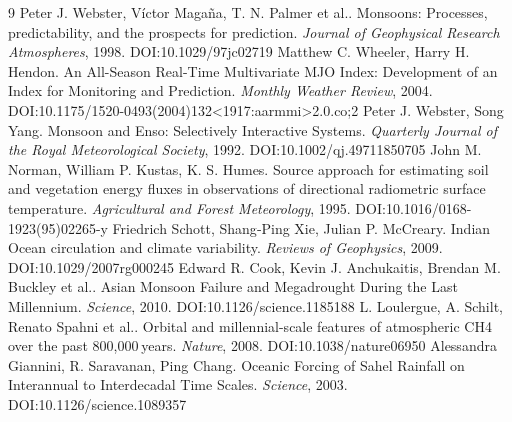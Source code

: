 \documentclass[11pt]{article}
\begin{document}
\begin{thebibliography}{9}
 Peter J. Webster, Víctor Magaña, T. N. Palmer et al.. Monsoons: Processes, predictability, and the prospects for prediction. \emph{Journal of Geophysical Research Atmospheres}, 1998. DOI:10.1029/97jc02719
 Matthew C. Wheeler, Harry H. Hendon. An All-Season Real-Time Multivariate MJO Index: Development of an Index for Monitoring and Prediction. \emph{Monthly Weather Review}, 2004. DOI:10.1175/1520-0493(2004)132<1917:aarmmi>2.0.co;2
 Peter J. Webster, Song Yang. Monsoon and Enso: Selectively Interactive Systems. \emph{Quarterly Journal of the Royal Meteorological Society}, 1992. DOI:10.1002/qj.49711850705
 John M. Norman, William P. Kustas, K. S. Humes. Source approach for estimating soil and vegetation energy fluxes in observations of directional radiometric surface temperature. \emph{Agricultural and Forest Meteorology}, 1995. DOI:10.1016/0168-1923(95)02265-y
 Friedrich Schott, Shang‐Ping Xie, Julian P. McCreary. Indian Ocean circulation and climate variability. \emph{Reviews of Geophysics}, 2009. DOI:10.1029/2007rg000245
 Edward R. Cook, Kevin J. Anchukaitis, Brendan M. Buckley et al.. Asian Monsoon Failure and Megadrought During the Last Millennium. \emph{Science}, 2010. DOI:10.1126/science.1185188
 L. Loulergue, A. Schilt, Renato Spahni et al.. Orbital and millennial-scale features of atmospheric CH4 over the past 800,000 years. \emph{Nature}, 2008. DOI:10.1038/nature06950
 Alessandra Giannini, R. Saravanan, Ping Chang. Oceanic Forcing of Sahel Rainfall on Interannual to Interdecadal Time Scales. \emph{Science}, 2003. DOI:10.1126/science.1089357
\end{thebibliography}
\end{document}
